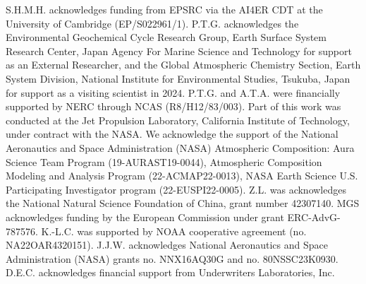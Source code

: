 \documentclass[gmd, manuscript]{copernicus}
\begin{document}





\begin{acknowledgements}
S.H.M.H. acknowledges funding from EPSRC via the AI4ER CDT at the University of Cambridge (EP/S022961/1). P.T.G. acknowledges the Environmental Geochemical Cycle Research Group, Earth Surface System Research Center, Japan Agency For Marine Science and Technology for support as an External Researcher, and the Global Atmospheric Chemistry Section, Earth System Division,  National Institute for Environmental Studies, Tsukuba, Japan for support as a visiting scientist in 2024. P.T.G. and A.T.A. were financially supported by NERC through NCAS (R8/H12/83/003).  Part of this work was conducted at the Jet Propulsion Laboratory, California Institute of Technology, under contract with the NASA. We acknowledge the support of the National Aeronautics and Space Administration (NASA) Atmospheric Composition: Aura Science Team Program (19-AURAST19-0044), Atmospheric Composition Modeling and Analysis Program (22-ACMAP22-0013), NASA Earth Science U.S. Participating Investigator program (22-EUSPI22-0005).
Z.L. was acknowledges the National Natural Science Foundation of China,  grant number 42307140. MGS acknowledges funding by the European Commission under grant ERC-AdvG-787576.  K.-L.C. was supported by NOAA cooperative agreement (no. NA22OAR4320151).  J.J.W. acknowledges National Aeronautics and Space Administration (NASA) grants no. NNX16AQ30G and no. 80NSSC23K0930.  D.E.C. acknowledges financial support from Underwriters Laboratories, Inc.


\end{acknowledgements}
\end{document}
